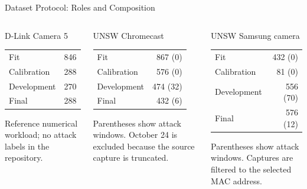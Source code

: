 \documentclass[aspectratio=169,10pt]{beamer}
\begin{document}
\begin{frame}{Dataset Protocol: Roles and Composition}
\begin{columns}[T,onlytextwidth]
\begin{block}{D-Link Camera 5}
\small
\begin{tabular}{@{}lr@{}}
Fit & 846\\
Calibration & 288\\
Development & 270\\
Final & 288\\
\end{tabular}
\par\medskip
Reference numerical workload; no attack labels in the repository.
\end{block}

\begin{block}{UNSW Chromecast}
\small
\begin{tabular}{@{}lr@{}}
Fit & 867 (0)\\
Calibration & 576 (0)\\
Development & 474 (32)\\
Final & 432 (6)\\
\end{tabular}
\par\medskip
Parentheses show attack windows. October 24 is excluded because the source
capture is truncated.
\end{block}

\begin{block}{UNSW Samsung camera}
\small
\begin{tabular}{@{}lr@{}}
Fit & 432 (0)\\
Calibration & 81 (0)\\
Development & 556 (70)\\
Final & 576 (12)\\
\end{tabular}
\par\medskip
Parentheses show attack windows. Captures are filtered to the selected MAC
address.
\end{block}
\end{columns}

\end{frame}
\end{document}

